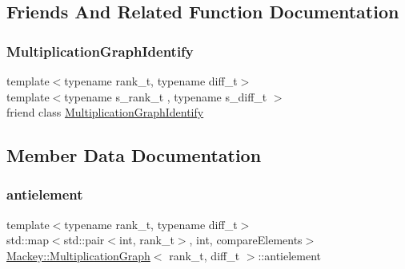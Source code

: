 \subsection{Friends And Related Function Documentation}
\mbox{\label{classMackey_1_1MultiplicationGraph_a3c44ae70fe9249e9662ab525f97dc1db}} 
\subsubsection{\texorpdfstring{Multiplication\+Graph\+Identify}{MultiplicationGraphIdentify}}
{\footnotesize\ttfamily template$<$typename rank\+\_\+t, typename diff\+\_\+t$>$ \\
template$<$typename s\+\_\+rank\+\_\+t , typename s\+\_\+diff\+\_\+t $>$ \\
friend class \hyperlink{classMackey_1_1MultiplicationGraphIdentify}{Multiplication\+Graph\+Identify}\hspace{0.3cm}{\ttfamily [friend]}}



\subsection{Member Data Documentation}
\mbox{\label{classMackey_1_1MultiplicationGraph_a8a0d1354d01f29d4388142aab0248389}} 
\subsubsection{\texorpdfstring{antielement}{antielement}}
{\footnotesize\ttfamily template$<$typename rank\+\_\+t, typename diff\+\_\+t$>$ \\
std\+::map$<$std\+::pair$<$int, rank\+\_\+t$>$, int, compare\+Elements$>$ \hyperlink{classMackey_1_1MultiplicationGraph}{Mackey\+::\+Multiplication\+Graph}$<$ rank\+\_\+t, diff\+\_\+t $>$\+::antielement\hspace{0.3cm}{\ttfamily [protected]}}



